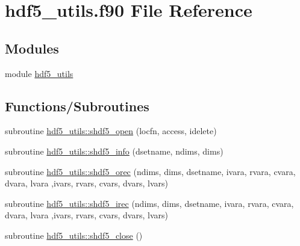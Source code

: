 \hypertarget{preproc_2ascii2hdf_2hdf5__utils_8f90}{}\section{hdf5\+\_\+utils.\+f90 File Reference}
\label{preproc_2ascii2hdf_2hdf5__utils_8f90}
\subsection*{Modules}
\begin{DoxyCompactItemize}
\item 
module \hyperlink{namespacehdf5__utils}{hdf5\+\_\+utils}
\end{DoxyCompactItemize}
\subsection*{Functions/\+Subroutines}
\begin{DoxyCompactItemize}
\item 
subroutine \hyperlink{namespacehdf5__utils_a8324e53f06756f48c91f3735f9d26640}{hdf5\+\_\+utils\+::shdf5\+\_\+open} (locfn, access, idelete)
\item 
subroutine \hyperlink{namespacehdf5__utils_a5dbfd8881a533f6a96e2fe24a26b41e7}{hdf5\+\_\+utils\+::shdf5\+\_\+info} (dsetname, ndims, dims)
\item 
subroutine \hyperlink{namespacehdf5__utils_a5ac4831db37043197944d11e350994cf}{hdf5\+\_\+utils\+::shdf5\+\_\+orec} (ndims, dims, dsetname, ivara, rvara, cvara, dvara, lvara                                                                                                                                                                   ,ivars, rvars, cvars, dvars, lvars)
\item 
subroutine \hyperlink{namespacehdf5__utils_a3d95236f5d68305d35c4c0cf93daac70}{hdf5\+\_\+utils\+::shdf5\+\_\+irec} (ndims, dims, dsetname, ivara, rvara, cvara, dvara, lvara                                                                                                                                                                   ,ivars, rvars, cvars, dvars, lvars)
\item 
subroutine \hyperlink{namespacehdf5__utils_ac2a5ad4876fe382625c40cd9964ca3c1}{hdf5\+\_\+utils\+::shdf5\+\_\+close} ()
\end{DoxyCompactItemize}
